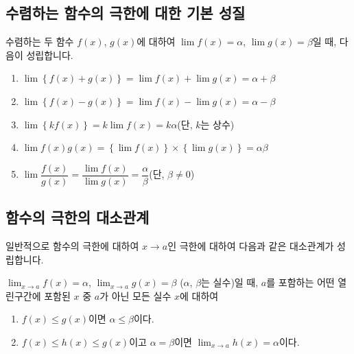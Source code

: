 \subsection{수렴하는 함수의 극한에 대한 기본 성질}
수렴하는 두 함수 $f \left( x \right) $, $g\left( x \right)  $에 대하여 $\lim f\left( x \right)  = \alpha$, $\lim g\left( x \right) = \beta$일 때, 다음이 성립합니다.
\begin{thmbox}
    \begin{enumerate}[label=\onum*]
        \item $\lim \left\{ f\left( x \right) + g\left( x \right)   \right\}  = \lim f\left( x \right) + \lim g\left( x \right)  = \alpha + \beta$
        \item $\lim \left\{ f\left( x \right) - g\left( x \right)   \right\} = \lim f\left( x \right)  - \lim g\left( x \right) = \alpha - \beta$
        \item $\lim \left\{ k f\left( x \right)  \right\} = k\lim f\left( x \right)  = k\alpha$\quad(단, $k$는 상수)
        \item $\lim f\left( x \right)g\left( x \right)    =  \left\{ \lim f\left( x \right) \right\}   \times \left\{ \lim g\left( x \right) \right\}  = \alpha \beta$
        \item $\lim\dfrac{f\left( x \right) }{g\left( x \right) }= \dfrac{\displaystyle\lim f\left( x \right) }{\displaystyle\lim g\left( x \right) } = \dfrac{\alpha}{\beta}$\quad(단, $\beta \ne 0$)
    \end{enumerate}
\end{thmbox}





\clearpage
\subsection{함수의 극한의 대소관계}
일반적으로 함수의 극한에 대하여 $x\to a$인 극한에 대하여 다음과 같은 대소관계가 성립합니다.
\begin{thmbox}
    $\lim_{x \to a} f\left( x \right) =\alpha$, $\lim_{x \to a} g\left( x \right) = \beta$ ($\alpha$, $\beta$는 실수)일 때, $a$를 포함하는 어떤 열린구간에 포함된 $x$ 중 $a$가 아닌 모든 실수 $x$에 대하여
   \begin{enumerate}[label={\onum*}]
       \item $f\left( x \right) \le g\left( x \right) $이면 $\alpha \le \beta$이다.
       \item $f\left( x \right) \le h\left( x \right) \le g\left( x \right) $이고 $\alpha=\beta$이면 $\lim_{x \to a}h\left( x \right) =\alpha$이다.
   \end{enumerate}
\end{thmbox}

